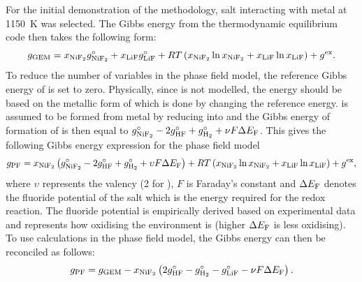 For the initial demonstration of the methodology,  salt interacting with  metal at \SI{1150}{\kelvin} was selected. The Gibbs energy from the thermodynamic equilibrium code then takes the following form:
\begin{equation*}
	g_\text{GEM} = x_{\ce{NiF2}} g_{\ce{NiF2}}^\circ + x_{\ce{LiF}} g_{\ce{LiF}}^\circ + RT\left( x_{\ce{NiF2}} \ln{x_{\ce{NiF2}}} + x_{\ce{LiF}} \ln{x_{\ce{LiF}}} \right) + g^\text{ex}.
\end{equation*}
To reduce the number of variables in the phase field model, the reference Gibbs energy of  is set to zero. Physically, since  is not modelled, the energy should be based on the metallic form of  which is done by changing the reference energy.  is assumed to be formed from  metal by reducing    into  and the Gibbs energy of formation of  is then equal to $g_{\ce{NiF2}}^\circ - 2 g_{\ce{HF}}^\circ + g_{\ce{H2}}^\circ + \nu F \Delta E_{\ce{F}}$. This gives the following Gibbs energy expression for the phase field model
\begin{equation*}
	g_\text{PF} = x_{\ce{NiF2}} \left( g_{\ce{NiF2}}^\circ - 2 g_{\ce{HF}}^\circ + g_{\ce{H2}}^\circ + \upsilon F \Delta E_{\ce{F}} \right) + RT\left( x_{\ce{NiF2}} \ln{x_{\ce{NiF2}}} + x_{\ce{LiF}} \ln{x_{\ce{LiF}}} \right) + g^\text{ex},
\end{equation*}
where $\upsilon$ represents the valency (2 for ), $F$ is Faraday's constant and $\Delta E_{\ce{F}}$ denotes the fluoride potential of the salt which is the energy required for the  redox reaction. The fluoride potential is empirically derived based on experimental data and represents how oxidising the environment is (higher $\Delta E_{\ce{F}}$ is less oxidising). To use {\GEM} calculations in the phase field model, the Gibbs energy can then be reconciled as follows:
\begin{equation*}
	g_\text{PF} = g_\text{GEM} - x_{\ce{NiF2}} \left( 2 g_{\ce{HF}}^\circ - g_{\ce{H2}}^\circ - g_{\ce{LiF}}^\circ - \nu F \Delta E_{\ce{F}} \right).
\end{equation*}

